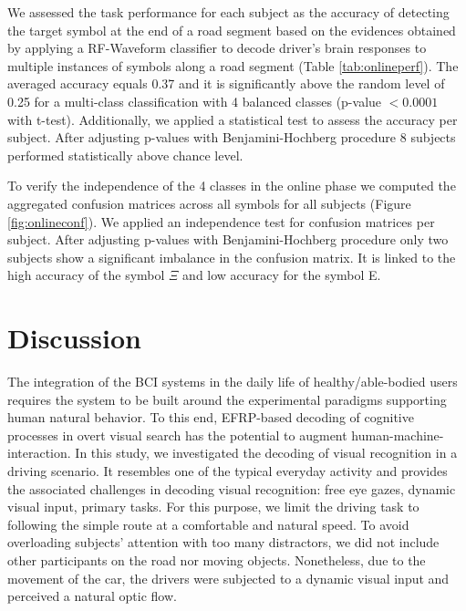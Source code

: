 \documentclass[12pt]{iopart}
\begin{document}
We assessed the task performance for each subject as the accuracy of
detecting the target symbol at the end of a road segment based on the evidences obtained by applying a RF-Waveform classifier
to decode driver’s brain responses to multiple instances of symbols along a road segment (Table \ref{tab:onlineperf}).
The averaged accuracy 
equals 0.37 and it is significantly above the random level of 0.25 for
a multi-class classification with 4 balanced classes (p-value $< 0.0001$ with t-test).
Additionally, we applied a statistical test to assess the accuracy per subject.
After adjusting p-values with Benjamini-Hochberg procedure 8 subjects performed statistically above chance level.

To verify the independence of the 4 classes in the online phase
we computed the aggregated confusion matrices across all symbols for all subjects (Figure \ref{fig:onlineconf}).
We applied an independence test for confusion matrices per subject.
After adjusting p-values with Benjamini-Hochberg procedure
only two subjects show a significant imbalance in the
confusion matrix. It is linked to the high accuracy of the symbol $\Xi$ and low accuracy 
for the symbol E.


\section{Discussion}
\label{sec:discussion}

The integration of the BCI systems in the daily life of 
healthy/able-bodied users requires the system 
to be built around the experimental paradigms
 supporting human natural behavior.
To this end, EFRP-based decoding of cognitive 
processes in overt visual search has the potential
to augment human-machine-interaction. 
In this study, we investigated the decoding of visual recognition in a driving scenario.
It resembles one of the typical everyday activity
and provides the associated challenges in decoding visual recognition:
free eye gazes, dynamic visual input, primary tasks.
For this purpose, we limit the driving task to following 
the simple route at a comfortable and natural speed.
To avoid overloading subjects' attention with too many distractors,
we did not include other participants on the road nor moving objects.
Nonetheless, due to the movement of the car, the drivers
were subjected to a dynamic visual input and perceived a
natural optic flow.
\end{document}
